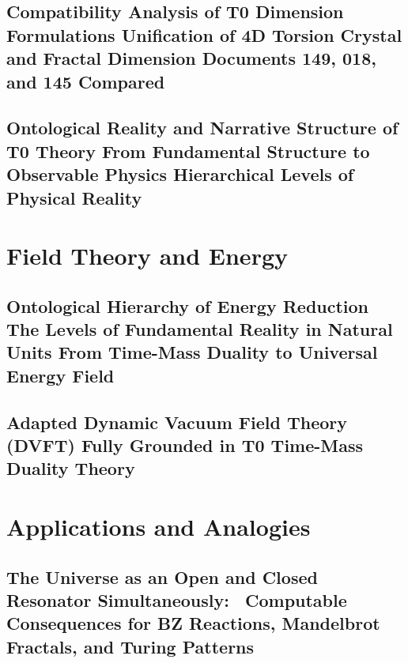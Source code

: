 \documentclass[11pt,oneside]{book}
\begin{document}
\chapter{Compatibility Analysis of T0 Dimension Formulations Unification of 4D Torsion Crystal and Fractal Dimension Documents 149, 018, and 145 Compared}


\chapter{Ontological Reality and Narrative Structure of T0 Theory From Fundamental Structure to Observable Physics Hierarchical Levels of Physical Reality}


\part{Field Theory and Energy}

\chapter{Ontological Hierarchy of Energy Reduction The Levels of Fundamental Reality in Natural Units From Time-Mass Duality to Universal Energy Field}


\chapter{Adapted Dynamic Vacuum Field Theory (DVFT) Fully Grounded in T0 Time-Mass Duality Theory}


\part{Applications and Analogies}

\chapter{The Universe as an Open and Closed Resonator Simultaneously: \ Computable Consequences for BZ Reactions, Mandelbrot Fractals, and Turing Patterns}

\end{document}
